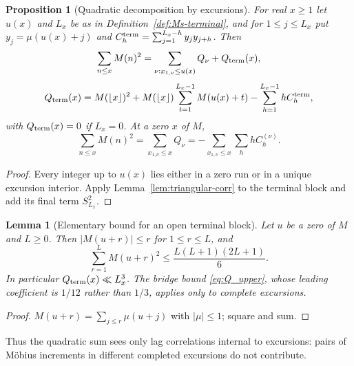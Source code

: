 \documentclass[11pt]{amsart}
\numberwithin{equation}{section}
\theoremstyle{plain}
\newtheorem{proposition}[theorem]{Proposition}
\newtheorem{lemma}[theorem]{Lemma}
\theoremstyle{definition}
\theoremstyle{remark}
\begin{document}
\begin{proposition}[Quadratic decomposition by excursions]
\label{prop:quadratic-decomp}
For real $x\ge1$ let $u(x)$ and $L_x$ be as in
Definition~\ref{def:Ms-terminal}, and for $1\le j\le L_x$ put
$y_j=\mu(u(x)+j)$ and $C_h^{\rm term}=\sum_{j=1}^{L_x-h}y_jy_{j+h}$. Then
\begin{equation}
\label{eq:quadratic-decomp-general}
\sum_{n\le x}M(n)^2
=\sum_{\nu:x_{1,\nu}\le u(x)}Q_\nu+Q_{\rm term}(x),
\end{equation}
\begin{equation}
\label{eq:terminal-Q-exact}
Q_{\rm term}(x)=M(\lfloor x\rfloor)^2
+M(\lfloor x\rfloor)\sum_{t=1}^{L_x-1}M(u(x)+t)
-\sum_{h=1}^{L_x-1}hC_h^{\rm term},
\end{equation}
with $Q_{\rm term}(x)=0$ if $L_x=0$. At a zero $x$ of $M$,
\begin{equation}
\label{eq:quadratic-decomp-zero}
\sum_{n\le x}M(n)^2
=\sum_{x_{1,\nu}\le x}Q_\nu
=-\sum_{x_{1,\nu}\le x}\sum_hhC_h^{(\nu)}.
\end{equation}
\end{proposition}

\begin{proof}
Every integer up to $u(x)$ lies either in a zero run or in a unique excursion
interior. Apply Lemma~\ref{lem:triangular-corr} to the terminal block and
add its final term $S_{L_x}^2$.
\end{proof}

\begin{lemma}[Elementary bound for an open terminal block]
\label{lem:terminal-Q-elementary}
Let $u$ be a zero of $M$ and $L\ge0$. Then $|M(u+r)|\le r$ for
$1\le r\le L$, and
\begin{equation}
\label{eq:terminal-Q-elementary}
\sum_{r=1}^{L}M(u+r)^2\le\frac{L(L+1)(2L+1)}6 .
\end{equation}
In particular $Q_{\rm term}(x)\ll L_x^3$. The bridge bound
\eqref{eq:Q_upper}, whose leading coefficient is $1/12$ rather than $1/3$,
applies only to complete excursions.
\end{lemma}

\begin{proof}
$M(u+r)=\sum_{j\le r}\mu(u+j)$ with $|\mu|\le1$; square and sum.
\end{proof}


Thus the quadratic sum sees only lag correlations internal to excursions:
pairs of M\"obius increments in different completed excursions do not
contribute.
\end{document}
